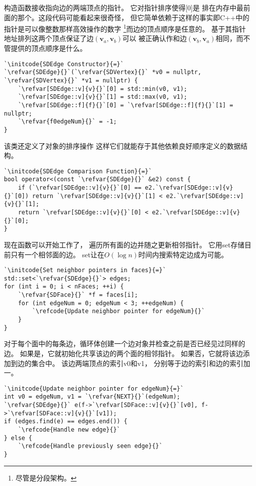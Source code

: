 构造函数接收指向边的两端顶点的指针。
它对指针排序使得{\ttfamily{}[0]}是
排在内存中最前面的那个。这段代码可能看起来很奇怪，
但它简单依赖于这样的事实即C++中的指针是可以像整数那样高效操作的数字
\footnote{尽管是分段架构。}而边的顶点顺序是任意的。
基于其指针地址排列这两个顶点保证了边$(\bm v_a,\bm v_b)$可以
被正确认作和边$(\bm v_b,\bm v_a)$相同，而不管提供的顶点顺序是什么。
\begin{lstlisting}
`\initcode{SDEdge Constructor}{=}`
`\refvar{SDEdge}{}`(`\refvar{SDVertex}{}` *v0 = nullptr, `\refvar{SDVertex}{}` *v1 = nullptr) {
    `\refvar[SDEdge::v]{v}{}`[0] = std::min(v0, v1);
    `\refvar[SDEdge::v]{v}{}`[1] = std::max(v0, v1);
    `\refvar[SDEdge::f]{f}{}`[0] = `\refvar[SDEdge::f]{f}{}`[1] = nullptr;
    `\refvar{f0edgeNum}{}` = -1;
}
\end{lstlisting}

该类还定义了对象的排序操作
这样它们就能存于其他依赖良好顺序定义的数据结构。
\begin{lstlisting}
`\initcode{SDEdge Comparison Function}{=}`
bool operator<(const `\refvar{SDEdge}{}` &e2) const {
    if (`\refvar[SDEdge::v]{v}{}`[0] == e2.`\refvar[SDEdge::v]{v}{}`[0]) return `\refvar[SDEdge::v]{v}{}`[1] < e2.`\refvar[SDEdge::v]{v}{}`[1];
    return `\refvar[SDEdge::v]{v}{}`[0] < e2.`\refvar[SDEdge::v]{v}{}`[0];
}
\end{lstlisting}

现在函数可以开始工作了，
遍历所有面的边并随之更新相邻指针。
它用{\ttfamily set}存储目前只有一个相邻面的边。
{\ttfamily set}让在$O(\log{n})$时间内搜索特定边成为可能。
\begin{lstlisting}
`\initcode{Set neighbor pointers in faces}{=}`
std::set<`\refvar{SDEdge}{}`> edges;
for (int i = 0; i < nFaces; ++i) {
    `\refvar{SDFace}{}` *f = faces[i];
    for (int edgeNum = 0; edgeNum < 3; ++edgeNum) {
        `\refcode{Update neighbor pointer for edgeNum}{}`
    }
}
\end{lstlisting}

对于每个面中的每条边，循环体创建一个边对象并检查之前是否已经见过同样的边。
如果是，它就初始化共享该边的两个面的相邻指针。
如果否，它就将该边添加到边的集合中。
该边两端顶点的索引{\ttfamily v0}和{\ttfamily v1}，
分别等于边的索引和边的索引加一。
\begin{lstlisting}
`\initcode{Update neighbor pointer for edgeNum}{=}`
int v0 = edgeNum, v1 = `\refvar{NEXT}{}`(edgeNum);
`\refvar{SDEdge}{}` e(f->`\refvar[SDFace::v]{v}{}`[v0], f->`\refvar[SDFace::v]{v}{}`[v1]);
if (edges.find(e) == edges.end()) {
    `\refcode{Handle new edge}{}`
} else {
    `\refcode{Handle previously seen edge}{}`
}
\end{lstlisting}

